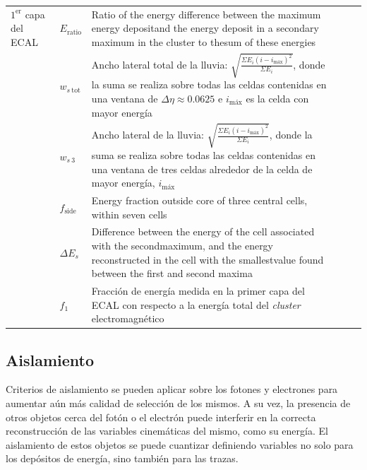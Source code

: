 \begin{table}
\begin{tabular}{ l p{2cm} p{8cm} c c c}
		\hline

		$1^{\text{er}}$ capa del ECAL & $E_{\text{ratio}}$ & Ratio of the energy difference between the maximum energy depositand the energy deposit in a secondary maximum in the cluster to thesum of these energies & \xmark & \cmark & \cmark \\

		 & $w_{s\:\text{tot}}$ & Ancho lateral total de la lluvia: $\sqrt{\frac{\Sigma E_{i}(i-i_{\text{máx}})^{2}}{\Sigma E_{i}}}$, donde la suma se realiza sobre todas las celdas contenidas en una ventana de $\Delta\eta\approx0.0625$ e $i_{\text{máx}}$ es la celda con mayor energía \tosolve{alto de la ventana?} & \xmark & \xmark & \cmark \\

		 & $w_{s\:\text{3}}$ & Ancho lateral de la lluvia: $\sqrt{\frac{\Sigma E_{i}(i-i_{\text{máx}})^{2}}{\Sigma E_{i}}}$, donde la suma se realiza sobre todas las celdas contenidas en una ventana de tres celdas alrededor de la celda de mayor energía, $i_{\text{máx}}$ & \xmark & \xmark & \cmark \\

		 & $f_{\text{side}}$ & Energy fraction outside core of three central cells, within seven cells \tosolve{entender y traducir bien} & \xmark & \xmark & \cmark \\

		 & $\Delta E_{s}$ & Difference between the energy of the cell associated with the secondmaximum, and the energy reconstructed in the cell with the smallestvalue found between the first and second maxima & \xmark & \xmark & \cmark \\

		 & $f_{\text{1}}$ & Fracción de energía medida en la primer capa del ECAL con respecto a la energía total del \textit{cluster} electromagnético & \xmark & \xmark & \cmark \\




	\end{tabular}
\label{phIDVars}
\end{table}




\subsection{Aislamiento}
\label{isolation}


Criterios de aislamiento se pueden aplicar sobre los fotones y electrones para aumentar aún más calidad de selección de los mismos. A su vez, la presencia de otros objetos cerca del fotón o el electrón puede interferir en la correcta reconstrucción de las variables cinemáticas del mismo, como su energía. El aislamiento de estos objetos se puede cuantizar definiendo variables no solo para los depósitos de energía, sino también para las trazas.

